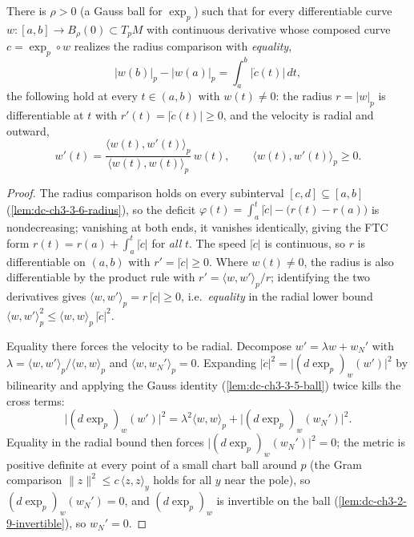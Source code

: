 \begin{lemma}
  \label{lem:dc-ch3-3-6-equality-radial}


  There is $\rho>0$ (a Gauss ball for $\exp_p$) such that for every
  differentiable curve $w:[a,b]\to B_\rho(0)\subset T_pM$ with continuous
  derivative whose composed curve $c=\exp_p\circ w$ realizes the radius
  comparison with \emph{equality},
  $$|w(b)|_p-|w(a)|_p=\int_a^b|\dot c(t)|\,dt,$$
  the following hold at every $t\in(a,b)$ with $w(t)\neq0$: the radius
  $r=|w|_p$ is differentiable at $t$ with $r'(t)=|\dot c(t)|\ge0$, and the
  velocity is radial and outward,
  $$w'(t)=\frac{\langle w(t),w'(t)\rangle_p}{\langle w(t),w(t)\rangle_p}\,
    w(t),\qquad\langle w(t),w'(t)\rangle_p\ge0.$$
\end{lemma}
\begin{proof}
  \sketch

  The radius comparison holds on every subinterval $[c,d]\subseteq[a,b]$
  (\cref{lem:dc-ch3-3-6-radius}), so the deficit
  $\varphi(t)=\int_a^t|\dot c|-\big(r(t)-r(a)\big)$ is nondecreasing;
  vanishing at both ends, it vanishes identically, giving the FTC form
  $r(t)=r(a)+\int_a^t|\dot c|$ for \emph{all} $t$. The speed $|\dot c|$ is
  continuous, so $r$ is differentiable on $(a,b)$ with $r'=|\dot c|\ge0$.
  Where $w(t)\neq0$, the radius is also differentiable by the product rule
  with $r'=\langle w,w'\rangle_p/r$; identifying the two derivatives gives
  $\langle w,w'\rangle_p=r\,|\dot c|\ge0$, i.e.\ \emph{equality} in the
  radial lower bound
  $\langle w,w'\rangle_p^2\le\langle w,w\rangle_p\,|\dot c|^2$.

  Equality there forces the velocity to be radial. Decompose
  $w'=\lambda w+w_N'$ with
  $\lambda=\langle w,w'\rangle_p/\langle w,w\rangle_p$ and
  $\langle w,w_N'\rangle_p=0$. Expanding
  $|\dot c|^2=\big|(d\exp_p)_w(w')\big|^2$ by bilinearity and applying the
  Gauss identity (\cref{lem:dc-ch3-3-5-ball}) twice kills the cross terms:
  $$\big|(d\exp_p)_w(w')\big|^2
    =\lambda^2\langle w,w\rangle_p+\big|(d\exp_p)_w(w_N')\big|^2.$$
  Equality in the radial bound then forces
  $\big|(d\exp_p)_w(w_N')\big|^2=0$; the metric is positive definite at
  every point of a small chart ball around $p$ (the Gram comparison
  $\|z\|^2\le c\,\langle z,z\rangle_y$ holds for all $y$ near the pole), so
  $(d\exp_p)_w(w_N')=0$, and $(d\exp_p)_w$ is invertible on the ball
  (\cref{lem:dc-ch3-2-9-invertible}), so $w_N'=0$.
\end{proof}

